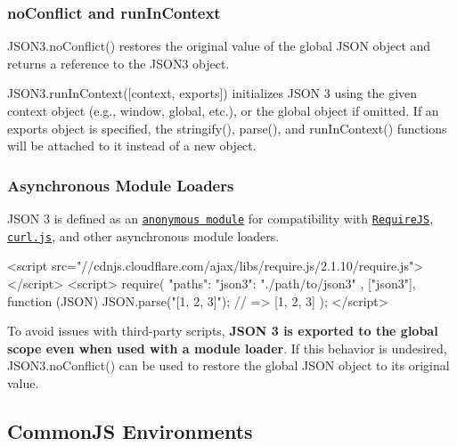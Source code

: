 \subsubsection*{{\ttfamily no\+Conflict} and {\ttfamily run\+In\+Context}}


\begin{DoxyItemize}
\item {\ttfamily J\+S\+O\+N3.\+no\+Conflict()} restores the original value of the global {\ttfamily J\+S\+ON} object and returns a reference to the {\ttfamily J\+S\+O\+N3} object.
\item {\ttfamily J\+S\+O\+N3.\+run\+In\+Context(\mbox{[}context, exports\mbox{]})} initializes J\+S\+ON 3 using the given {\ttfamily context} object (e.\+g., {\ttfamily window}, {\ttfamily global}, etc.), or the global object if omitted. If an {\ttfamily exports} object is specified, the {\ttfamily stringify()}, {\ttfamily parse()}, and {\ttfamily run\+In\+Context()} functions will be attached to it instead of a new object.
\end{DoxyItemize}

\subsubsection*{Asynchronous Module Loaders}

J\+S\+ON 3 is defined as an \href{https://github.com/amdjs/amdjs-api/wiki/AMD#define-function-}{\tt anonymous module} for compatibility with \href{http://requirejs.org/}{\tt Require\+JS}, \href{https://github.com/cujojs/curl}{\tt {\ttfamily curl.\+js}}, and other asynchronous module loaders. \begin{DoxyVerb}<script src="//cdnjs.cloudflare.com/ajax/libs/require.js/2.1.10/require.js"></script>
<script>
  require({
    "paths": {
      "json3": "./path/to/json3"
    }
  }, ["json3"], function (JSON) {
    JSON.parse("[1, 2, 3]");
    // => [1, 2, 3]
  });
</script>
\end{DoxyVerb}


To avoid issues with third-\/party scripts, {\bfseries J\+S\+ON 3 is exported to the global scope even when used with a module loader}. If this behavior is undesired, {\ttfamily J\+S\+O\+N3.\+no\+Conflict()} can be used to restore the global {\ttfamily J\+S\+ON} object to its original value.

\subsection*{Common\+JS Environments}

